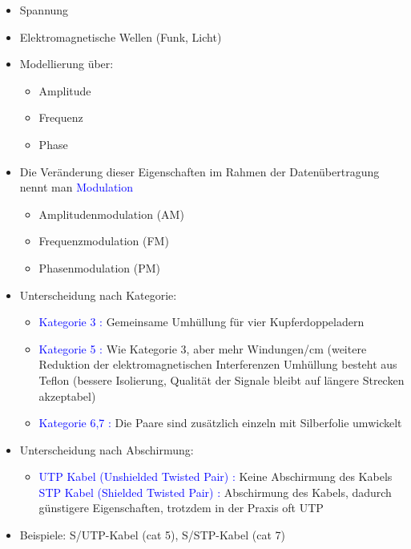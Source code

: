\begin{itemize}
    \item Spannung
    \item Elektromagnetische Wellen (Funk, Licht)
    \item Modellierung über:
    \begin{itemize}
        \item Amplitude
        \item Frequenz
        \item Phase
    \end{itemize}
    \item Die Veränderung dieser Eigenschaften im Rahmen
    der Datenübertragung nennt man \textcolor{blue}{Modulation}
    \begin{itemize}
        \item Amplitudenmodulation (AM)
        \item Frequenzmodulation (FM)
        \item Phasenmodulation (PM)
    \end{itemize}
\end{itemize}

\begin{itemize}
    \item Unterscheidung nach Kategorie:
    \begin{itemize}
        \item \textcolor{blue}{Kategorie 3 :} Gemeinsame Umhüllung für vier Kupferdoppeladern
        \item \textcolor{blue}{Kategorie 5 :}
        Wie Kategorie 3, aber mehr Windungen/cm (weitere Reduktion der elektromagnetischen Interferenzen Umhüllung besteht aus Teflon (bessere Isolierung, Qualität der Signale bleibt auf längere Strecken akzeptabel)
        \item \textcolor{blue}{Kategorie 6,7 :} Die Paare sind zusätzlich einzeln mit Silberfolie umwickelt
    \end{itemize}
    \item Unterscheidung nach Abschirmung:
    \begin{itemize}
        \item \textcolor{blue}{UTP Kabel (Unshielded Twisted Pair) :} Keine Abschirmung des Kabels
        \textcolor{blue}{STP Kabel (Shielded Twisted Pair) :} Abschirmung des Kabels, dadurch günstigere Eigenschaften, trotzdem in der Praxis oft UTP
    \end{itemize}
    \item Beispiele: S/UTP-Kabel (cat 5), S/STP-Kabel (cat 7)
\end{itemize}

